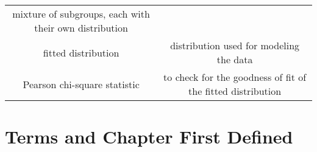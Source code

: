 \documentclass[]{book}
\theoremstyle{definition}
\theoremstyle{definition}
\theoremstyle{definition}
\theoremstyle{remark}
\begin{document}
\begin{longtable}[]{@{}cc@{}}
\begin{minipage}[t]{0.43\columnwidth}
mixture of subgroups, each with their own distribution\strut
\end{minipage}\tabularnewline
\begin{minipage}[t]{0.43\columnwidth}\centering\strut
fitted distribution\strut
\end{minipage} & \begin{minipage}[t]{0.43\columnwidth}\centering\strut
distribution used for modeling the data\strut
\end{minipage}\tabularnewline
\begin{minipage}[t]{0.43\columnwidth}\centering\strut
Pearson chi-square statistic\strut
\end{minipage} & \begin{minipage}[t]{0.43\columnwidth}\centering\strut
to check for the goodness of fit of the fitted distribution\strut
\end{minipage}\tabularnewline
\bottomrule
\end{longtable}

\chapter{Terms and Chapter First
Defined}\label{terms-and-chapter-first-defined}
\end{document}
